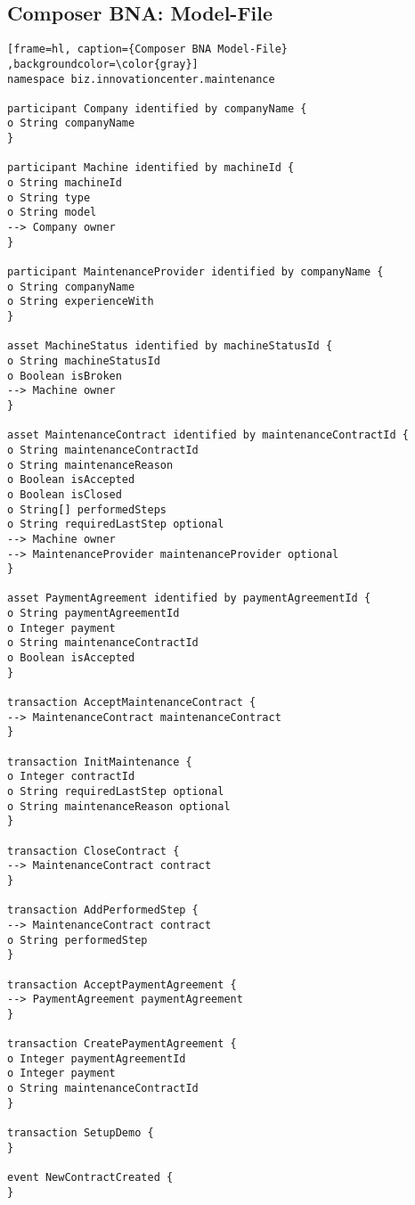 \begin{appendices}

\chapter{Composer BNA: Model-File}
\label{append:model-file}
    
\begin{lstlisting}[frame=hl, caption={Composer BNA Model-File} ,backgroundcolor=\color{gray}]
namespace biz.innovationcenter.maintenance

participant Company identified by companyName {
o String companyName  
}

participant Machine identified by machineId {
o String machineId
o String type
o String model
--> Company owner
}

participant MaintenanceProvider identified by companyName {
o String companyName
o String experienceWith
}

asset MachineStatus identified by machineStatusId {
o String machineStatusId
o Boolean isBroken
--> Machine owner
}

asset MaintenanceContract identified by maintenanceContractId {
o String maintenanceContractId
o String maintenanceReason
o Boolean isAccepted
o Boolean isClosed
o String[] performedSteps
o String requiredLastStep optional
--> Machine owner
--> MaintenanceProvider maintenanceProvider optional
}

asset PaymentAgreement identified by paymentAgreementId {
o String paymentAgreementId
o Integer payment
o String maintenanceContractId
o Boolean isAccepted
}

transaction AcceptMaintenanceContract {
--> MaintenanceContract maintenanceContract
}

transaction InitMaintenance {
o Integer contractId
o String requiredLastStep optional
o String maintenanceReason optional
}

transaction CloseContract {
--> MaintenanceContract contract
}

transaction AddPerformedStep {
--> MaintenanceContract contract
o String performedStep
}

transaction AcceptPaymentAgreement {
--> PaymentAgreement paymentAgreement
}

transaction CreatePaymentAgreement {
o Integer paymentAgreementId
o Integer payment
o String maintenanceContractId
}

transaction SetupDemo {
}

event NewContractCreated {
}


\end{lstlisting}
\end{appendices}

